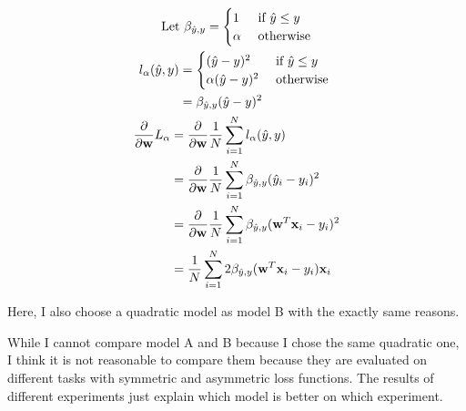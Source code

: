 \documentclass{introtosml}
\newcommand\fancyb{\beta_{\hat{y}, y}}
\begin{document}
\begin{p}
\begin{itemize}
    \end{itemize}

  \item
    \begin{gather*}
      \text{Let} \fancyb = \begin{cases}
        1 & \mif \hat{y} \le y \\
        \alpha & \otherwise
      \end{cases} \\
      \begin{aligned}
        l_\alpha(\hat{y}, y)
        & = \begin{cases}
          (\hat{y} - y)^2 & \mif \hat{y} \le y \\
          \alpha (\hat{y} - y)^2 & \otherwise
        \end{cases} \\
        & = \fancyb (\hat{y} - y)^2
      \end{aligned} \\
      \begin{aligned}
        \frac{\partial}{\partial \vec{w}} L_\alpha
        & = \frac{\partial}{\partial \vec{w}}
            \frac{1}{N} \sum_{i=1}^N l_\alpha(\hat{y}, y) \\
        & = \frac{\partial}{\partial \vec{w}}
            \frac{1}{N} \sum_{i=1}^N \fancyb (\hat{y}_i - y_i)^2 \\
        & = \frac{\partial}{\partial \vec{w}}
            \frac{1}{N} \sum_{i=1}^N \fancyb (\vec{w}^T \vec{x}_i - y_i)^2 \\
        & = \frac{1}{N} \sum_{i=1}^N 2 \fancyb (\vec{w}^T \vec{x}_i - y_i) \vec{x}_i \\
      \end{aligned}
    \end{gather*}

    Here, I also choose a quadratic model as model B with the exactly same reasons.

    While I cannot compare model A and B because I chose the same quadratic one,
    I think it is not reasonable to compare them because they are evaluated
    on different tasks with symmetric and asymmetric loss functions.
    The results of different experiments just explain which model is better
    on which experiment.
\end{p}
\end{document}
